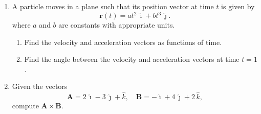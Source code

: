 \documentclass[../main.tex]{subfiles}
\begin{document}
\begin{enumerate}
\[
\mathbf{F} = 200\,\hat{\imath} + 300\,\hat{\jmath} + 400\,\hat{k} 
\quad \left[\frac{\mathrm{L}}{\mathrm{m}^2 \cdot \mathrm{s}}\right]
\]
                                                                
\begin{enumerate}
    \item Compute the area vector $\mathbf{A}$ of the surface (the vector normal to the surface with magnitude equal to the area of the surface).
    \item Compute the volume of water per unit time (in liters per second) passing through the surface using:
    \[
    Q = \mathbf{F} \cdot \mathbf{A}.
    \]
    \item Discuss how the orientation of the surface affects the water flow through it.
\end{enumerate}

    \item A particle moves in a plane such that its position vector at time \(t\) is given by
          \[
            \mathbf{r}(t) = at^2\,\hat{\imath} + bt^3\,\hat{\jmath}.
          \]
          where $a$ and $b$ are constants with appropriate units.
          \begin{enumerate}
            \item Find the velocity and acceleration vectors as functions of time.
            \item Find the angle between the velocity and acceleration vectors at time \(t = 1\).
          \end{enumerate}

    \item Given the vectors
\[
\mathbf{A} = 2\,\hat{\imath} - 3\,\hat{\jmath} + \hat{k}, \quad 
\mathbf{B} = -\hat{\imath} + 4\,\hat{\jmath} + 2\,\hat{k},
\]
compute $\mathbf{A} \times \mathbf{B}$.
    
          
\end{enumerate}
\end{document}
